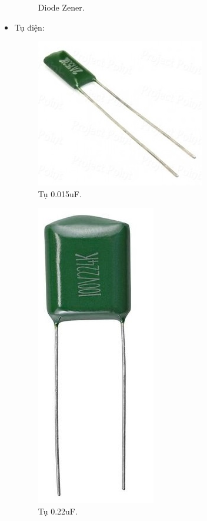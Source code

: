 \documentclass[a4paper,12pt,oneside]{article}
\begin{document}
\begin{itemize}
\begin{figure}[H]
\begin{center}
\end{center}
\caption{Diode Zener.}
\end{figure}
\item	Tụ điện:
\begin{figure}[H]
\centering
\begin{center}
\includegraphics[scale=.5]{hinh/PPM/ppm_c015.jpg}
\end{center}
\caption{Tụ 0.015uF.}
\end{figure}
\begin{figure}[H]
\centering
\begin{center}
\includegraphics[scale=.3]{hinh/PPM/ppm_c22.jpg}
\end{center}
\caption{Tụ 0.22uF.}
\end{figure}

\end{itemize}
\end{document}
